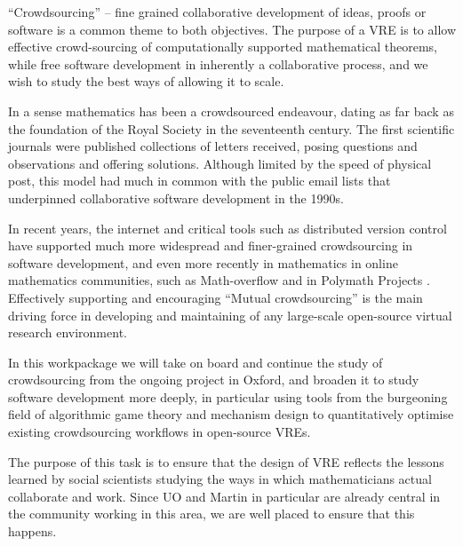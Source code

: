 \begin{workpackage}[id=social-aspects,wphases=0-48,
  title=Social Aspects,
  lead=UO,
  UORM=23,USHRM=18,USORM=6]
\begin{wpdescription}

``Crowdsourcing'' -- fine grained collaborative development of ideas,
  proofs or software is a common theme to both objectives. The purpose
  of a VRE is to allow effective crowd-sourcing of computationally
  supported mathematical theorems, while free software development in
  inherently a collaborative process, and we wish to study the best
  ways of allowing it to scale.

  In a sense mathematics has been a crowdsourced endeavour, dating as
  far back as the foundation of the Royal Society in the seventeenth
  century.  The first scientific journals were published collections
  of letters received, posing questions and observations and offering
  solutions.  Although limited by the speed of physical post, this
  model had much in common with the public email lists that
  underpinned collaborative software development in the 1990s.

In recent years, the internet and critical tools such as distributed
version control have supported much more widespread and finer-grained
crowdsourcing in software development, and even more recently in
mathematics in online mathematics communities, such as Math-overflow
\cite{mathoverflow} and in Polymath Projects \cite{polymath_SIAM,
  PolymathBlog}.  Effectively supporting and encouraging ``Mutual
crowdsourcing'' is the main driving force in developing and
maintaining of any large-scale open-source virtual research
environment.

In this workpackage we will take on board and continue the study of
crowdsourcing from the ongoing project in Oxford, and broaden it to
study software development more deeply, in particular using tools
from the burgeoning field of algorithmic game theory and mechanism design to 
quantitatively optimise existing crowdsourcing workflows in open-source VREs.

\end{wpdescription}

\begin{tasklist}
\begin{task}[title=Social Science Input to
    Design,id=social-input,lead=UO,PM=18, partners={UO,PS}]
The purpose of this task is to ensure that the design of \TheProject
VRE reflects the lessons learned by social scientists studying the
ways in which mathematicians actual collaborate and work. Since UO and
Martin in particular are already central in the community
working in this area, we are well placed to ensure that this happens. 


\end{task}
\end{tasklist}
\end{workpackage}
